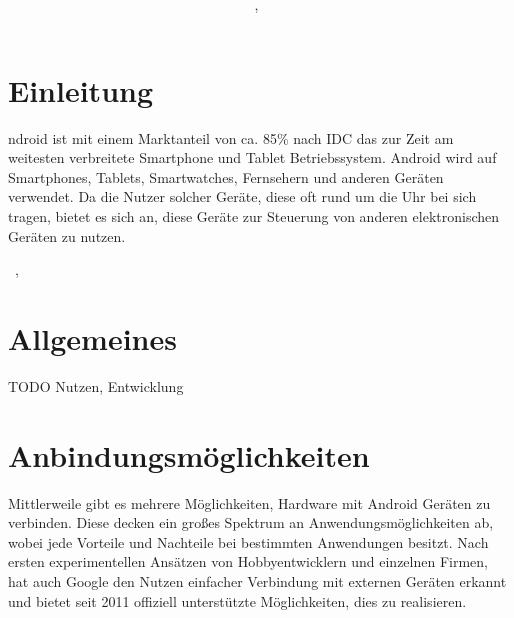 \documentclass[12pt,journal,compsoc]{IEEEtran}
\begin{document}
\title{\paperTitle \\ \paperSubTitle }
\author{\paperAuthor,~}%



\maketitle

\section{Einleitung}


ndroid ist mit einem Marktanteil von ca. 85\% nach IDC das zur Zeit am weitesten verbreitete Smartphone und Tablet Betriebssystem.\cite{marketshare}
Android wird auf Smartphones, Tablets, Smartwatches, Fernsehern und anderen Geräten verwendet.
Da die Nutzer solcher Geräte, diese oft rund um die Uhr bei sich tragen, bietet es sich an, diese Geräte zur Steuerung von anderen elektronischen Geräten zu nutzen.





\hfill{\the\day~\Monat, \the\year  }

\section{Allgemeines}
TODO Nutzen, Entwicklung

\section{Anbindungsmöglichkeiten}
Mittlerweile gibt es mehrere Möglichkeiten, Hardware mit Android Geräten zu verbinden. 
Diese decken ein großes Spektrum an Anwendungsmöglichkeiten ab, wobei jede Vorteile und Nachteile bei bestimmten Anwendungen besitzt.
Nach ersten experimentellen Ansätzen von Hobbyentwicklern und einzelnen Firmen, hat auch Google den Nutzen einfacher Verbindung mit externen Geräten 
erkannt und bietet seit 2011 offiziell unterstützte Möglichkeiten, dies zu realisieren. 
\end{document}

